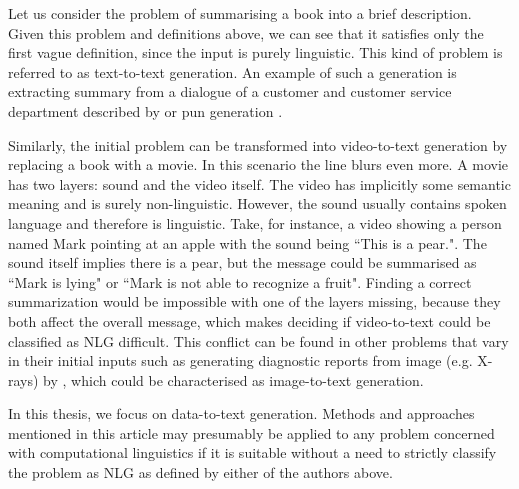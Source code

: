 Let us consider the problem of summarising a book into a brief description. Given this problem and definitions above, we can see that it satisfies only the first vague definition, since the input is purely linguistic. This kind of problem is referred to as text-to-text generation. An example of such a generation is extracting summary from a dialogue of a customer and customer service department described by \citet{liu2019automatic} or pun generation \citep{ritchie2005computational}.
 
Similarly, the initial problem can be transformed into video-to-text generation by replacing a book with a movie. In this scenario the line blurs even more. A movie has two layers: sound and the video itself. The video has implicitly some semantic meaning and is surely non-linguistic. However, the sound usually contains spoken language and therefore is linguistic. Take, for instance, a video showing a person named Mark pointing at an apple with the sound being ``This is a pear.". The sound itself implies there is a pear, but the message could be summarised as ``Mark is lying" or ``Mark is not able to recognize a fruit". Finding a correct summarization would be impossible with one of the layers missing, because they both affect the overall message, which makes deciding if video-to-text could be classified as NLG difficult. This conflict can be found in other problems that vary in their initial inputs such as generating diagnostic reports from image (e.g. X-rays) by \citet{zeng2020generating}, which could be characterised as image-to-text generation.

In this thesis, we focus on data-to-text generation. Methods and approaches mentioned in this article may presumably be applied to any problem concerned with computational linguistics if it is suitable without a need to strictly classify the problem as NLG as defined by either of the authors above.

